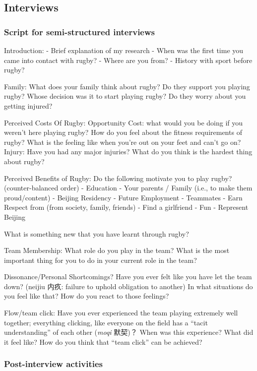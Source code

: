 \begin{CJK}{UTF8}{gbsn}
\subsection{Interviews}
  \subsubsection{Script for semi-structured interviews \label{sect:semiStructured}}


Introduction:
- Brief explanation of my research
- When was the first time you came into contact with rugby?
- Where are you from?
- History with sport before rugby?

Family:
What does your family think about rugby?
Do they support you playing rugby?
Whose decision was it to start playing rugby?
Do they worry about you getting injured?

Perceived Costs Of Rugby:
Opportunity Cost: what would you be doing if you weren't here playing rugby?
How do you feel about the fitness requirements of rugby?
What is the feeling like when you're out on your feet and can't go on?
Injury: Have you had any major injuries?
What do you think is the hardest thing about rugby?

Perceived Benefits of Rugby:
Do the following motivate you to play rugby? (counter-balanced order)
- Education
- Your parents / Family (i.e., to make them proud/content)
- Beijing Residency
- Future Employment
- Teammates
- Earn Respect from (from society, family, friends)
- Find a girlfriend
- Fun
- Represent Beijing

What is something new that you have learnt through rugby?

Team Membership:
What role do you play in the team?
What is the most important thing for you to do in your current role in the team?

Dissonance/Personal Shortcomings?
Have you ever felt like you have let the team down?  (neijiu 内疚: failure to uphold obligation to another)
In what situations do you feel like that?
How do you react to those feelings?

Flow/team click:
Have you ever experienced the team playing extremely well together; everything clicking, like everyone on the field has a “tacit understanding” of each other (\textit{moqi} 默契)？
When was this experience?
What did it feel like?
How do you think that “team click” can be achieved?


\subsubsection{Post-interview activities\label{sect:postInterview}}



\end{CJK}
